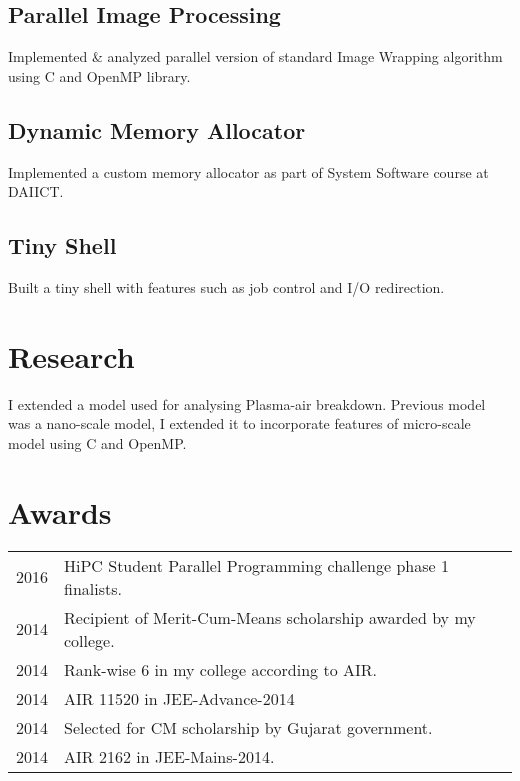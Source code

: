 \documentclass[]{deedy-resume-openfont}
\begin{document}
\begin{minipage}[t]{0.66\textwidth}
\subsection{Parallel Image Processing}
Implemented \& analyzed parallel version of standard Image Wrapping algorithm using C and
OpenMP library.
\sectionsep

\subsection{Dynamic Memory Allocator}
Implemented a custom memory allocator as part of System Software course at DAIICT.
\sectionsep

\subsection{Tiny Shell}
Built a tiny shell with features such as job control and I/O redirection.
\sectionsep


\section{Research}
I extended a model used for analysing Plasma-air breakdown. Previous model was a
nano-scale model, I extended it to incorporate features of micro-scale model using C
and OpenMP.
\sectionsep


\section{Awards} 
\begin{tabular}{rl}
2016        & HiPC Student Parallel Programming challenge phase 1 finalists.\\
2014        & Recipient of Merit-Cum-Means scholarship awarded by my college. \\
2014        & Rank-wise 6 in my college according to AIR.\\
2014        & AIR 11520 in JEE-Advance-2014 \\	
2014        & Selected for CM scholarship by Gujarat government. \\
2014        & AIR 2162 in JEE-Mains-2014.
\end{tabular}
\sectionsep

\end{minipage} 
\end{document}
